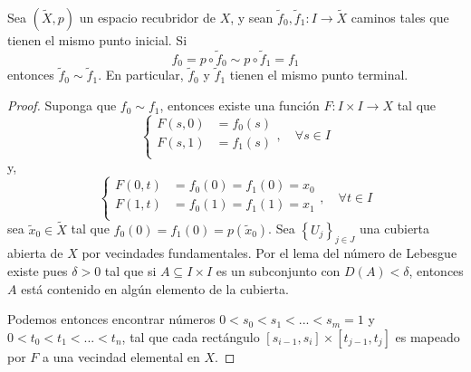 \documentclass{article}
\theoremstyle{largebreak}
\newcommand\cf[3]{\ensuremath{#1:#2\rightarrow#3}}
\begin{document}
    \begin{lema}
        \label{lemaF2}
        Sea $(\widetilde{X},p)$ un espacio recubridor de $X$, y sean $\cf{\widetilde{f}_0,\widetilde{f}_1}{I}{\widetilde{X}}$ caminos tales que tienen el mismo punto inicial. Si
        \begin{equation*}
            f_0=p\circ\widetilde{f}_0\sim p\circ\widetilde{f}_1=f_1
        \end{equation*}
        entonces $\widetilde{f}_0\sim\widetilde{f}_1$. En particular, $\widetilde{f}_0$ y $\widetilde{f}_1$ tienen el mismo punto terminal.
    \end{lema}

    \begin{proof}
        Suponga que $f_0\sim f_1$, entonces existe una función $\cf{F}{I\times I}{X}$ tal que
        \begin{equation*}
            \left\{
                \begin{split}
                    F(s,0) & = f_0(s) \\
                    F(s,1) & = f_1(s) \\
                \end{split}
            \right.,\quad\forall s\in I
        \end{equation*}
        y,
        \begin{equation*}
            \left\{
                \begin{split}
                    F(0,t) & = f_0(0)=f_1(0)=x_0 \\
                    F(1,t) & = f_0(1)=f_1(1)=x_1 \\
                \end{split}
            \right.,\quad\forall t\in I
        \end{equation*}
        sea $\widetilde{x}_0\in\widetilde{X}$ tal que $f_0(0)=f_1(0)=p(\widetilde{x}_0)$. Sea $\left\{U_j \right\}_{ j\in J}$ una cubierta abierta de $X$ por vecindades fundamentales. Por el lema del número de Lebesgue existe pues $\delta>0$ tal que si $A\subseteq I\times I$ es un subconjunto con $D(A)<\delta$, entonces $A$ está contenido en algún elemento de la cubierta.

        Podemos entonces encontrar números $0<s_0<s_1<...<s_m=1$ y $0<t_0<t_1<...<t_n$, tal que cada rectángulo $[s_{ i-1},s_i]\times [t_{ j-1},t_j]$ es mapeado por $F$ a una vecindad elemental en $X$.


\end{proof}
\end{document}
